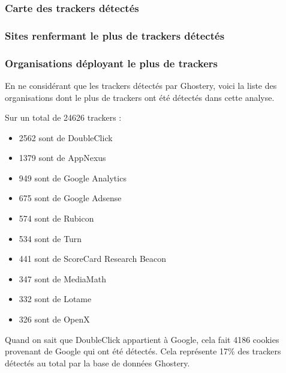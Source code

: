 \subsubsection{Carte des trackers détectés}


\subsubsection{Sites renfermant le plus de trackers détectés}

\subsubsection{Organisations déployant le plus de trackers}
En ne considérant que les trackers détectés par Ghostery, voici la liste des organisations dont le plus de trackers ont été détectés dans cette analyse.
\newline

Sur un total de 24626 trackers :
\begin{itemize}
  \item 2562 sont de DoubleClick
  \item 1379 sont de AppNexus
  \item 949 sont de Google Analytics
  \item 675 sont de Google Adsense
  \item 574 sont de Rubicon
  \item 534 sont de Turn
  \item 441 sont de ScoreCard Research Beacon
  \item 347 sont de MediaMath
  \item 332 sont de Lotame
  \item 326 sont de OpenX
  \newline
\end{itemize}

Quand on sait que DoubleClick appartient à Google, cela fait 4186 cookies provenant de Google qui ont été détectés. Cela représente 17\% des trackers détectés au total par la base de données Ghostery.
